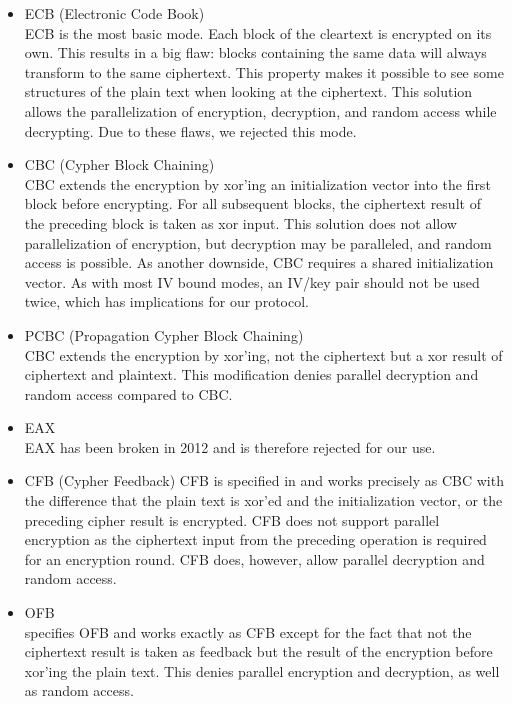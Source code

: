 \begin{itemize}
	\item ECB (Electronic Code Book)\\
	      ECB is the most basic mode. Each block of the cleartext is encrypted on its own. This results in a big flaw: blocks containing the same data will always transform to the same ciphertext. This property makes it possible to see some structures of the plain text when looking at the ciphertext. This solution allows the parallelization of encryption, decryption, and random access while decrypting. Due to these flaws, we rejected this mode.
	\item CBC (Cypher Block Chaining)\\  
	      CBC extends the encryption by xor'ing an initialization vector into the first block before encrypting. For all subsequent blocks, the ciphertext result of the preceding block is taken as xor input. This solution does not allow parallelization of encryption, but decryption may be paralleled, and random access is possible. As another downside, CBC requires a shared initialization vector. As with most IV bound modes, an IV/key pair should not be used twice, which has implications for our protocol.
	\item PCBC (Propagation Cypher Block Chaining)\\
	      CBC extends the encryption by xor'ing, not the ciphertext but a xor result of ciphertext and plaintext. This modification denies parallel decryption and random access compared to CBC.
	\item EAX\\      
	      EAX has been broken in 2012\cite{minematsu2013attacks} and is therefore rejected for our use.
	\item CFB (Cypher Feedback)
	      CFB is specified in \cite{dworkin2001recommendation} and works precisely as CBC with the difference that the plain text is xor'ed and the initialization vector, or the preceding cipher result is encrypted. CFB does not support parallel encryption as the ciphertext input from the preceding operation is required for an encryption round. CFB does, however, allow parallel decryption and random access.
	\item OFB\\
	      \cite{dworkin2001recommendation} specifies OFB and works exactly as CFB except for the fact that not the ciphertext result is taken as feedback but the result of the encryption before xor'ing the plain text. This denies parallel encryption and decryption, as well as random access.

\end{itemize}
